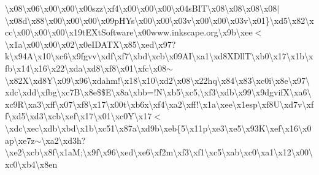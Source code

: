 \begin{DoxyCompactItemize}
\textbackslash{}x08\textbackslash{}x06\textbackslash{}x00\textbackslash{}x00\textbackslash{}x00szz\textbackslash{}xf4\textbackslash{}x00\textbackslash{}x00\textbackslash{}x00\textbackslash{}x04s\+B\+I\+T\textbackslash{}x08\textbackslash{}x08\textbackslash{}x08\textbackslash{}x08$\vert$\textbackslash{}x08d\textbackslash{}x88\textbackslash{}x00\textbackslash{}x00\textbackslash{}x00\textbackslash{}x09p\+H\+Ys\textbackslash{}x00\textbackslash{}x00\textbackslash{}x03v\textbackslash{}x00\textbackslash{}x00\textbackslash{}x03v\textbackslash{}x01\}\textbackslash{}xd5\textbackslash{}x82\textbackslash{}xcc\textbackslash{}x00\textbackslash{}x00\textbackslash{}x00\textbackslash{}x19t\+E\+Xt\+Software\textbackslash{}x00www.\+inkscape.\+org\textbackslash{}x9b\textbackslash{}xee$<$\textbackslash{}x1a\textbackslash{}x00\textbackslash{}x00\textbackslash{}x02\textbackslash{}x0e\+I\+D\+A\+T\+X\textbackslash{}x85\textbackslash{}xed\textbackslash{}x97?k\textbackslash{}x94\+A\textbackslash{}x10\textbackslash{}xc6\textbackslash{}x9fgvv\textbackslash{}xdf\textbackslash{}xf7\textbackslash{}xbd\textbackslash{}xcb\textbackslash{}x09\+A\+I\textbackslash{}xa1\textbackslash{}xd8\+X\+Dll\+T\textbackslash{}xb0\textbackslash{}x17\textbackslash{}x1b\textbackslash{}xfb\textbackslash{}x14\textbackslash{}x16\textbackslash{}x22\textbackslash{}xda\textbackslash{}xd8\textbackslash{}xf8\textbackslash{}x01\textbackslash{}xfc\textbackslash{}x08$\sim$\textbackslash{}x82\+X\textbackslash{}xd8\+Y\textbackslash{}x09\textbackslash{}x96\textbackslash{}xdahm!\textbackslash{}x18\textbackslash{}x10\textbackslash{}xd2\textbackslash{}x08\textbackslash{}x22hq\textbackslash{}x84\textbackslash{}x83\textbackslash{}xc0i\textbackslash{}x8e\textbackslash{}x97\textbackslash{}xdc\textbackslash{}xdd\textbackslash{}xfbg\textbackslash{}xc7\+B\textbackslash{}x8e\$\$\+E\textbackslash{}x8a\textbackslash{}xbb=!\+N\textbackslash{}xb5\textbackslash{}xc5,\textbackslash{}xf3\textbackslash{}xdb\textbackslash{}x99\textbackslash{}x9dgvif\+X\textbackslash{}xa6\textbackslash{}xc9\+R\textbackslash{}xa3\textbackslash{}xff\textbackslash{}x07\textbackslash{}xf8\textbackslash{}x17\textbackslash{}x00t\textbackslash{}xb6x\textbackslash{}xf4\textbackslash{}xa2\textbackslash{}xff!\textbackslash{}x1a\textbackslash{}xee\textbackslash{}x1esp\textbackslash{}xf8\+U\textbackslash{}xd7v\textbackslash{}xff\textbackslash{}xd5\textbackslash{}xd3\textbackslash{}xcb\textbackslash{}xef\textbackslash{}x17\textbackslash{}x01\textbackslash{}xc0\+Y\textbackslash{}x17$<$\textbackslash{}xdc\textbackslash{}xec\textbackslash{}xdb\textbackslash{}xbd\textbackslash{}x1b\textbackslash{}xc51\textbackslash{}x87a\textbackslash{}xd9b\textbackslash{}xeb\{5\textbackslash{}x11p\textbackslash{}xe3\textbackslash{}xe5\textbackslash{}x93\+K\textbackslash{}xef\textbackslash{}x16\textbackslash{}x0ap\textbackslash{}xe7z$\sim$\textbackslash{}xa2\textbackslash{}xd3h?\textbackslash{}xe2\textbackslash{}xcb\textbackslash{}x8f\textbackslash{}x1a\+M;\textbackslash{}x9f\textbackslash{}x96\textbackslash{}xed\textbackslash{}xe6\textbackslash{}xf2m\textbackslash{}xf3\textbackslash{}xf1\textbackslash{}xc5\textbackslash{}xab\textbackslash{}xc0\textbackslash{}xa1\textbackslash{}x12\textbackslash{}x00\textbackslash{}xc0\textbackslash{}xb4\textbackslash{}x8e\textquotesingle{}n\textbackslas
\end{DoxyCompactItemize}
